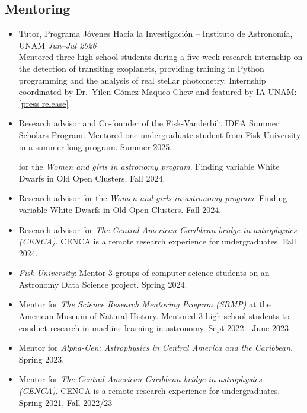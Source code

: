 \documentclass[letterpaper,10pt]{article}
\begin{document}
  \subsection*{Mentoring}

  
  \begin{itemize}[label=$\blacktriangleright$]


  \item Tutor, Programa J\'ovenes Hacia la Investigaci\'on --
Instituto de Astronom\'ia, UNAM \hfill \textit{Jun--Jul 2026} \\
Mentored three high school students during a five-week research internship
on the detection of transiting exoplanets, providing training
in Python programming and the analysis of real stellar photometry.
Internship coordinated by Dr.\ Yilen G\'omez Maqueo Chew and featured by
IA-UNAM:
\href{https://astronomia.unam.mx/noticias/estudiantes-de-preparatoria-buscan-exoplanetas-con-acompanamiento-de-la-unam/}{[press release]}

     \item Research advisor and Co-founder of the Fisk-Vanderbilt IDEA Summer Scholars Program. Mentored one undergraduate student from Fisk University in a summer long program. Summer 2025.
     
     for the \emph{Women and girls in astronomy program}. Finding variable White Dwarfs in Old Open Clusters. Fall 2024. 

   \item Research advisor for the \emph{Women and girls in astronomy program}. Finding variable White Dwarfs in Old Open Clusters. Fall 2024. 


   \item Research advisor for \emph{The Central American-Caribbean bridge in astrophysics (CENCA)}. CENCA is a remote research experience for undergraduates. Fall 2024. 

  \item \emph{Fisk University}: Mentor 3 groups of computer science students on an Astronomy Data Science project. Spring 2024.  
  
  \item Mentor for \emph{The Science Research Mentoring Program (SRMP)} at the American Museum of Natural History. Mentored 3 high school students to conduct research in machine learning in astronomy. Sept 2022 - June 2023

          \item Mentor for \emph{Alpha-Cen: Astrophysics in Central America and the Caribbean}. Spring 2023.

   \item Mentor for \emph{The Central American-Caribbean bridge in astrophysics (CENCA)}. CENCA is a remote research experience for undergraduates. Spring 2021, Fall 2022/23
\end{itemize}
  
\end{document}

